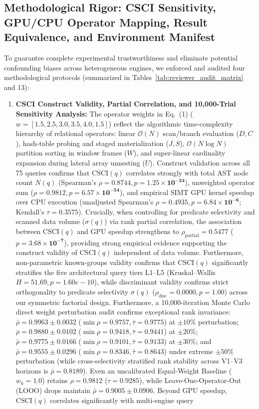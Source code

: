\documentclass[10pt,a4paper]{article}
\begin{document}
\subsection{Methodological Rigor: CSCI Sensitivity, GPU/CPU Operator Mapping, Result Equivalence, and Environment Manifest}
To guarantee complete experimental trustworthiness and eliminate potential confounding biases across heterogeneous engines, we enforced and audited four methodological protocols (summarized in Tables~\ref{tab:reviewer_audit_matrix} and 13):
\begin{enumerate}[leftmargin=1.5em,itemsep=2pt]
    \item \textbf{CSCI Construct Validity, Partial Correlation, and 10,000-Trial Sensitivity Analysis:} The operator weights in Eq.~(1) ($w = [1.5, 2.5, 3.0, 3.5, 4.0, 1.5]$) reflect the algorithmic time-complexity hierarchy of relational operators: linear $\mathcal{O}(N)$ scan/branch evaluation ($D, C$), hash-table probing and staged materialization ($J, S$), $\mathcal{O}(N \log N)$ partition sorting in window frames ($W$), and super-linear cardinality expansion during lateral array unnesting ($U$). Construct validation across all 75 queries confirms that $\text{CSCI}(q)$ correlates strongly with total AST node count $N(q)$ (Spearman's $\rho = \mathbf{0.8744}, p = \mathbf{1.25 \times 10^{-24}}$), unweighted operator sum ($\rho = \mathbf{0.9812}, p = \mathbf{6.57 \times 10^{-54}}$), and empirical SIMT GPU kernel speedup over CPU execution (unadjusted Spearman's $\rho = \mathbf{0.4935}, p = \mathbf{6.84 \times 10^{-6}}$; Kendall's $\tau = \mathbf{0.3575}$). Crucially, when controlling for predicate selectivity and scanned data volume ($\sigma(q)$) via rank partial correlation, the association between $\text{CSCI}(q)$ and GPU speedup strengthens to $\rho_{\text{partial}} = \mathbf{0.5477}$ ($p = \mathbf{3.68 \times 10^{-7}}$), providing strong empirical evidence supporting the construct validity of $\text{CSCI}(q)$ independent of data volume. Furthermore, non-parametric known-groups validity confirms that $\text{CSCI}(q)$ significantly stratifies the five architectural query tiers L1--L5 (Kruskal--Wallis $H = 51.69, p = 1.60e-10$), while discriminant validity confirms strict orthogonality to predicate selectivity $\sigma(q)$ ($\rho_{\text{disc}} = 0.0000, p = 1.00$) across our symmetric factorial design. Furthermore, a 10,000-iteration Monte Carlo direct weight perturbation audit confirms exceptional rank invariance: $\bar{\rho} = \mathbf{0.9963} \pm 0.0032$ ($\min \rho = 0.9757, \bar{\tau}=0.9775$) at $\pm 10\%$ perturbation; $\bar{\rho} = \mathbf{0.9880} \pm 0.0102$ ($\min \rho = 0.9418, \bar{\tau}=0.9441$) at $\pm 20\%$; $\bar{\rho} = \mathbf{0.9775} \pm 0.0166$ ($\min \rho = 0.9101, \bar{\tau}=0.9133$) at $\pm 30\%$; and $\bar{\rho} = \mathbf{0.9555} \pm 0.0296$ ($\min \rho = 0.8346, \bar{\tau}=0.8643$) under extreme $\pm 50\%$ perturbation (while cross-selectivity stratified rank stability across V1--V3 horizons is $\bar{\rho}=0.8189$). Even an uncalibrated Equal-Weight Baseline ($w_k = 1.0$) retains $\rho = \mathbf{0.9812}$ ($\tau = 0.9285$), while Leave-One-Operator-Out (LOOO) drops maintain $\bar{\rho} = \mathbf{0.9005} \pm 0.0906$. Beyond GPU speedup, $\text{CSCI}(q)$ correlates significantly with multi-engine query 
\end{enumerate}
\end{document}
